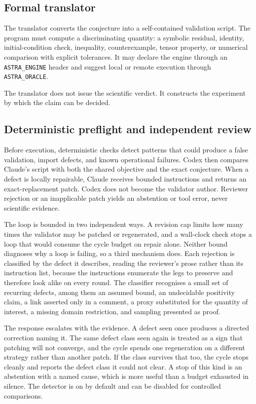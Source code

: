 \documentclass[11pt,a4paper]{article}
\begin{document}
\subsection{Formal translator}

The translator converts the conjecture into a self-contained validation script. The program must compute a discriminating quantity: a symbolic residual, identity, initial-condition check, inequality, counterexample, tensor property, or numerical comparison with explicit tolerances. It may declare the engine through an \texttt{ASTRA\_ENGINE} header and suggest local or remote execution through \texttt{ASTRA\_ORACLE}.

The translator does not issue the scientific verdict. It constructs the experiment by which the claim can be decided.

\subsection{Deterministic preflight and independent review}

Before execution, deterministic checks detect patterns that could produce a false validation, import defects, and known operational failures. Codex then compares Claude's script with both the shared objective and the exact conjecture. When a defect is locally repairable, Claude receives bounded instructions and returns an exact-replacement patch. Codex does not become the validator author. Reviewer rejection or an inapplicable patch yields an abstention or tool error, never scientific evidence.

The loop is bounded in two independent ways. A revision cap limits how many times the validator may be patched or regenerated, and a wall-clock check stops a loop that would consume the cycle budget on repair alone. Neither bound diagnoses why a loop is failing, so a third mechanism does. Each rejection is classified by the defect it describes, reading the reviewer's prose rather than its instruction list, because the instructions enumerate the legs to preserve and therefore look alike on every round. The classifier recognises a small set of recurring defects, among them an assumed bound, an undecidable positivity claim, a link asserted only in a comment, a proxy substituted for the quantity of interest, a missing domain restriction, and sampling presented as proof.

The response escalates with the evidence. A defect seen once produces a directed correction naming it. The same defect class seen again is treated as a sign that patching will not converge, and the cycle spends one regeneration on a different strategy rather than another patch. If the class survives that too, the cycle stops cleanly and reports the defect class it could not clear. A stop of this kind is an abstention with a named cause, which is more useful than a budget exhausted in silence. The detector is on by default and can be disabled for controlled comparisons.
\end{document}

